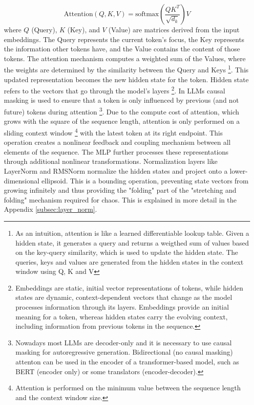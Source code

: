 \documentclass[a4paper,12pt]{article}
\begin{document}
\begin{equation}
    \text{Attention}(Q, K, V) = \text{softmax}\left(\frac{QK^T}{\sqrt{d_k}}\right)V
\end{equation}
where $Q$ (Query), $K$ (Key), and $V$ (Value) are matrices derived from the input embeddings. The Query represents the current token's focus, the Key represents the information other tokens have, and the Value contains the content of those tokens. The attention mechanism computes a weighted sum of the Values, where the weights are determined by the similarity between the Query and Keys \footnote{As an intuition, attention is like a learned differentiable lookup table. Given a hidden state, it generates a query and returns a weigthed sum of values based on the key-query similarity, which is used to update the hidden state. The queries, keys and values are generated from the hidden states in the context window using Q, K and V}. This updated representation becomes the new hidden state for the token. Hidden state refers to the vectors that go through the model's layers \footnote{Embeddings are static, initial vector representations of tokens, while hidden states are dynamic, context-dependent vectors that change as the model processes information through its layers. Embeddings provide an initial meaning for a token, whereas hidden states carry the evolving context, including information from previous tokens in the sequence.}.
In LLMs causal masking is used to ensure that a token is only influenced by previous (and not future) tokens during attention 
\footnote{Nowadays most LLMs are decoder-only and it is necessary to use causal masking for autoregressive generation. Bidirectional (no causal masking) attenton can be used in the encoder of a transformer-based model, such as BERT (encoder only) or some translators (encoder-decoder).}.
Due to the compute cost of attention, which grows with the square of the sequence length, attention is only performed on a sliding context window \footnote{Attention is performed on the minimum value between the sequence length and the context window size.} with the latest token at its right endpoint.
This operation creates a nonlinear feedback and coupling mechanism between all elements of the sequence. The MLP further processes these representations through additional nonlinear transformations. Normalization layers like LayerNorm and RMSNorm normalize the hidden states and project onto a lower-dimensional ellipsoid. This is a bounding operation, preventing state vectors from growing infinitely and thus providing the "folding" part of the "stretching and folding" mechanism required for chaos. This is explained in more detail in the Appendix \ref{subsec:layer_norm}. %
\end{document}
